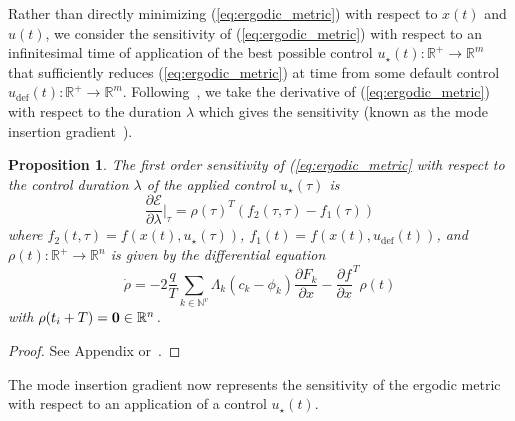 \documentclass[letterpaper, 10 pt, conference]{ieeeconf}  %
\newtheorem{proposition}{Proposition}
\begin{document}
Rather than directly minimizing (\ref{eq:ergodic_metric}) with respect to $x(t)$ and $u(t)$, we consider the sensitivity of (\ref{eq:ergodic_metric}) with respect to an infinitesimal time of application  of the best possible control $u_\star(t) : \mathbb{R}^+ \to \mathbb{R}^m$ that sufficiently reduces (\ref{eq:ergodic_metric}) at time  from some default control $u_\text{def}(t) : \mathbb{R}^+  \to \mathbb{R}^m$.
Following~\cite{mavrommatiTRO2017realTime}, we take the derivative of (\ref{eq:ergodic_metric}) with respect to the duration  $\lambda$  which gives the sensitivity (known as the mode insertion gradient~\cite{vasudevan2013consistent, axelsson2008gradient, egerstedt2006transition,caldwell2016projection}).
\begin{proposition} \label{prop:mode_insert}
The first order sensitivity of (\ref{eq:ergodic_metric} with respect to the control duration $\lambda$ of the applied control $u_\star(\tau)$ is
\begin{equation}\label{eq:mode_insertion}
\frac{\partial \mathcal{E}}{\partial \lambda} \Big \vert_\tau = \rho(\tau)^T (f_2(\tau, \tau) - f_1(\tau))
\end{equation}
where $f_2(t, \tau) = f(x(t), u_\star(\tau))$, $f_1(t) = f(x(t), u_\text{def}(t))$, and $\rho(t) : \mathbb{R}^+ \to \mathbb{R}^n$ is given by the differential equation
\begin{equation*}
\dot{\rho} = - 2 \frac{q}{T} \sum_{k \in \mathbb{N}^v} \Lambda_k (c_k - \phi_k) \frac{\partial F_k}{\partial x} - \frac{\partial f}{\partial x}^T \rho(t)
\end{equation*}
with $\rho(t_i + T) = \bold{0} \in \mathbb{R}^n$.
\end{proposition}
\begin{proof}
See Appendix or~\cite{mavrommatiTRO2017realTime}.
\end{proof}
The mode insertion gradient now represents the sensitivity of the ergodic metric with respect to an application of a control $u_\star (t)$. 
\end{document}
